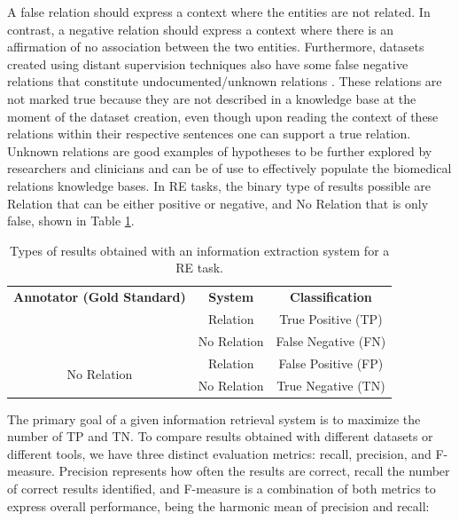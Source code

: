 A false relation should express a context where the entities are not related. In contrast, a negative relation should express a context where there is an affirmation of no association between the two entities. Furthermore, datasets created using distant supervision techniques also have some false negative relations that constitute undocumented/unknown relations \citep{sousa2019silver}. These relations are not marked true because they are not described in a knowledge base at the moment of the dataset creation, even though upon reading the context of these relations within their respective sentences one can support a true relation. Unknown relations are good examples of hypotheses to be further explored by researchers and clinicians and can be of use to effectively populate the biomedical relations knowledge bases. In RE tasks, the binary type of results possible are Relation that can be either positive or negative, and No Relation that is only false, shown in Table \ref{table:evaluation}.

\begin{table}[ht]
\renewcommand\arraystretch{1.2}
\centering
\caption[Types of Results Obtained with an Information Extraction System for a RE Task]{Types of results obtained with an information extraction system for a RE task.}
\begin{tabular}{ |c|c|c| }
\hline
\textbf{Annotator (Gold Standard)} & \textbf{System} & \textbf{Classification}\\
\Xhline{2\arrayrulewidth}
\multirow{2}{*}{Relation} & Relation & True Positive (TP) \\
\cline{2-3}
 & No Relation & False Negative (FN) \\ 
\hline
\multirow{2}{*}{No Relation} & Relation & False Positive (FP) \\
\cline{2-3}
 & No Relation & True Negative (TN) \\
 \hline
\end{tabular}
\label{table:evaluation}
\end{table}

The primary goal of a given information retrieval system is to maximize the number of TP and TN. To compare results obtained with different datasets or different tools, we have three distinct evaluation metrics: recall, precision, and F-measure. Precision represents how often the results are correct, recall the number of correct results identified, and F-measure is a combination of both metrics to express overall performance, being the harmonic mean of precision and recall:

